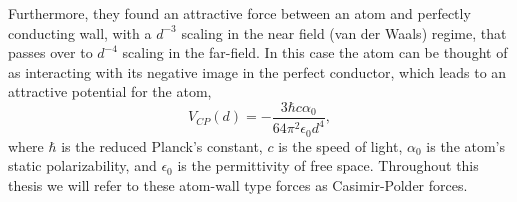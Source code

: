 Furthermore, they found an attractive force between an atom and perfectly conducting wall, with a $d^{-3}$ scaling
in the near field (van der Waals) regime, that passes over to $d^{-4}$ scaling in the far-field.
In this case the atom can be thought of as interacting with its negative image in the perfect conductor,   
which leads to an attractive potential for the atom,
\begin{equation}
  V_{CP}(d) =-\frac{3\hbar c\alpha_0}{64\pi^2\epsilon_0 d^4},
\end{equation}
where $\hbar$ is the reduced Planck's constant, $c$ is the speed of light, $\alpha_0$ is the atom's static polarizability,
and $\epsilon_0$ is the permittivity of free space.  Throughout this thesis we will refer to these
atom-wall type forces as Casimir-Polder forces.  

